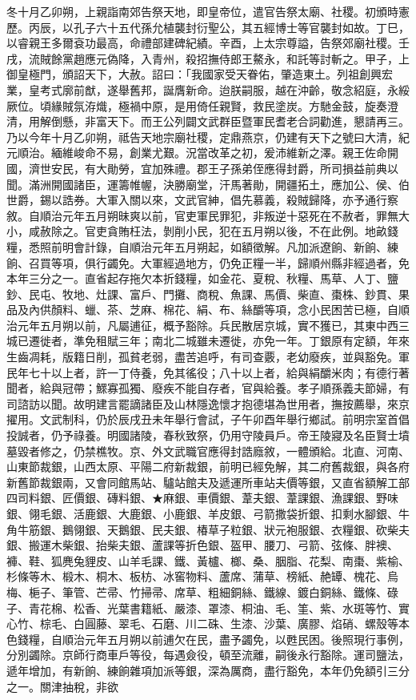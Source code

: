 \begin{pinyinscope}
冬十月乙卯朔，上親詣南郊告祭天地，即皇帝位，遣官告祭太廟、社稷。初頒時憲歷。丙辰，以孔子六十五代孫允植襲封衍聖公，其五經博士等官襲封如故。丁巳，以睿親王多爾袞功最高，命禮部建碑紀績。辛酉，上太宗尊謚，告祭郊廟社稷。壬戌，流賊餘黨趙應元偽降，入青州，殺招撫侍郎王鰲永，和託等討斬之。甲子，上御皇極門，頒詔天下，大赦。詔曰：「我國家受天眷佑，肇造東土。列祖創興宏業，皇考式廓前猷，遂舉舊邦，誕膺新命。迨朕嗣服，越在沖齡，敬念紹庭，永綏厥位。頃緣賊氛洊熾，極禍中原，是用倚任親賢，救民塗炭。方馳金鼓，旋奏澄清，用解倒懸，非富天下。而王公列闢文武群臣暨軍民耆老合詞勸進，懇請再三。乃以今年十月乙卯朔，祗告天地宗廟社稷，定鼎燕京，仍建有天下之號曰大清，紀元順治。緬維峻命不易，創業尤艱。況當改革之初，爰沛維新之澤。親王佐命開國，濟世安民，有大勛勞，宜加殊禮。郡王子孫弟侄應得封爵，所司損益前典以聞。滿洲開國諸臣，運籌帷幄，決勝廟堂，汗馬著勛，開疆拓土，應加公、侯、伯世爵，錫以誥券。大軍入關以來，文武官紳，倡先慕義，殺賊歸降，亦予通行察敘。自順治元年五月朔昧爽以前，官吏軍民罪犯，非叛逆十惡死在不赦者，罪無大小，咸赦除之。官吏貪賄枉法，剝削小民，犯在五月朔以後，不在此例。地畝錢糧，悉照前明會計錄，自順治元年五月朔起，如額徵解。凡加派遼餉、新餉、練餉、召買等項，俱行蠲免。大軍經過地方，仍免正糧一半，歸順州縣非經過者，免本年三分之一。直省起存拖欠本折錢糧，如金花、夏稅、秋糧、馬草、人丁、鹽鈔、民屯、牧地、灶課、富戶、門攤、商稅、魚課、馬價、柴直、棗株、鈔貫、果品及內供顏料、蠟、茶、芝麻、棉花、絹、布、絲釂等項，念小民困苦已極，自順治元年五月朔以前，凡屬逋征，概予豁除。兵民散居京城，實不獲已，其東中西三城已遷徙者，準免租賦三年；南北二城雖未遷徙，亦免一年。丁銀原有定額，年來生齒凋耗，版籍日削，孤貧老弱，盡苦追呼，有司查覈，老幼廢疾，並與豁免。軍民年七十以上者，許一丁侍養，免其徭役；八十以上者，給與絹釂米肉；有德行著聞者，給與冠帶；鰥寡孤獨、廢疾不能自存者，官與給養。孝子順孫義夫節婦，有司諮訪以聞。故明建言罷謫諸臣及山林隱逸懷才抱德堪為世用者，撫按薦舉，來京擢用。文武制科，仍於辰戌丑未年舉行會試，子午卯酉年舉行鄉試。前明宗室首倡投誠者，仍予祿養。明國諸陵，春秋致祭，仍用守陵員戶。帝王陵寢及名臣賢士墳墓毀者修之，仍禁樵牧。京、外文武職官應得封誥廕敘，一體頒給。北直、河南、山東節裁銀，山西太原、平陽二府新裁銀，前明已經免解，其二府舊裁銀，與各府新舊節裁銀兩，又會同館馬站、驢站館夫及遞運所車站夫價等銀，又直省額解工部四司料銀、匠價銀、磚料銀、★麻銀、車價銀、葦夫銀、葦課銀、漁課銀、野味銀、翎毛銀、活鹿銀、大鹿銀、小鹿銀、羊皮銀、弓箭撒袋折銀、扣剩水腳銀、牛角牛筋銀、鵝翎銀、天鵝銀、民夫銀、椿草子粒銀、狀元袍服銀、衣糧銀、砍柴夫銀、搬運木柴銀、抬柴夫銀、蘆課等折色銀、盔甲、腰刀、弓箭、弦條、胖襖、褲、鞋、狐麂兔貍皮、山羊毛課、鐵、黃櫨、榔、桑、胭脂、花梨、南棗、紫榆、杉條等木、椴木、桐木、板枋、冰窖物料、蘆席、蒲草、榜紙、赩罈、槐花、烏梅、梔子、筆管、芒帚、竹掃帚、席草、粗細銅絲、鐵線、鍍白銅絲、鐵條、碌子、青花棉、松香、光葉書籍紙、嚴漆、罩漆、桐油、毛、筀、紫、水斑等竹、實心竹、棕毛、白圓藤、翠毛、石磨、川二硃、生漆、沙葉、廣膠、焰硝、螺殼等本色錢糧，自順治元年五月朔以前逋欠在民，盡予蠲免，以甦民困。後照現行事例，分別蠲除。京師行商車戶等役，每遇僉役，頓至流離，嗣後永行豁除。運司鹽法，遞年增加，有新餉、練餉雜項加派等銀，深為厲商，盡行豁免，本年仍免額引三分之一。關津抽稅，非欲
\end{pinyinscope}
